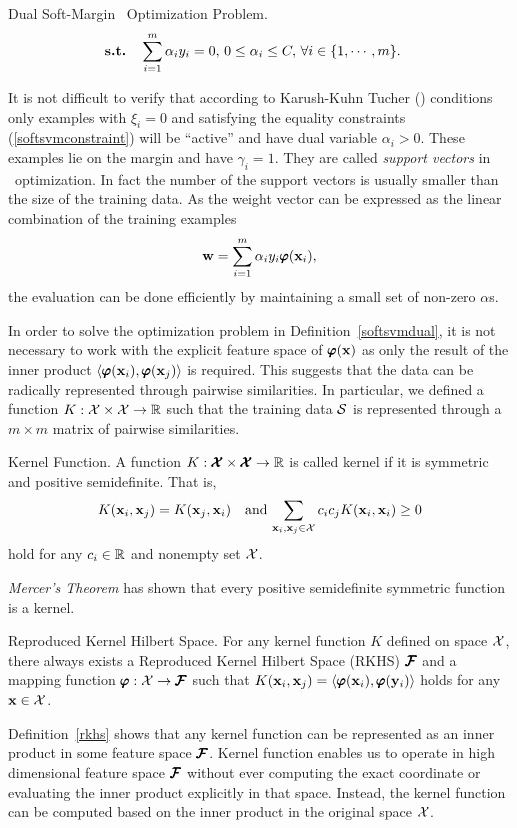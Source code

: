 {\begin{definition}{Dual Soft-Margin \svm\ Optimization Problem.}
\begin{align*}
		\textbf{s.t.} & \quad \sum_{i=1}^{m}\alpha_iy_i=0, \, 0\le\alpha_i\le C, \, \forall i\in\{1,\cdots,m\}.
	\end{align*}
\end{definition}
\noindent
It is not difficult to verify that according to Karush-Kuhn Tucher (\kkt) conditions only examples with $\xi_i=0$ and satisfying the equality constraints (\ref{softsvmconstraint}) will be ``active'' and have dual variable $\alpha_i>0$.
These examples lie on the margin and have $\gamma_i=1$.
They are called \textit{support vectors} in \svm\ optimization.
In fact the number of the support vectors is usually smaller than the size of the training data.
As the weight vector can be expressed as the linear combination of the training examples \citep{taylor04}
\begin{align*}
	\mathbf {w} = \sum_{i=1}^{m}\alpha_iy_i\pmb \varphi(\mathbf {x}_i),
\end{align*}
the evaluation can be done efficiently by maintaining a small set of non-zero $\alpha$s.

In order to solve the optimization problem in Definition~\ref{softsvmdual}, it is not necessary to work with the explicit feature space of $\pmb \varphi(\mathbf {x})$ as only the result of the inner product $\langle \pmb \varphi(\mathbf {x}_i), \pmb \varphi(\mathbf {x}_j) \rangle$ is required.
This suggests that the data can be radically represented through pairwise similarities.
In particular, we defined a function $K:\mathcal{X}\times\mathcal{X}\rightarrow\mathbb{R}$ such that the training data $\mathcal{S}$ is represented through a $m\times m$ matrix of pairwise similarities.
\begin{definition}{Kernel Function.}
 	A function $K:\pmb {\mathcal{X}}\times\pmb {\mathcal{X}}\rightarrow\mathbb{R}$ is called kernel if it is symmetric and positive semidefinite. That is, 
\begin{align*}
	K(\mathbf {x}_i,\mathbf {x}_j) = K(\mathbf {x}_j,\mathbf {x}_i)\quad \text{and}\, \sum_{\mathbf {x}_i,\mathbf {x}_j\in\mathcal{X}}c_ic_jK(\mathbf {x}_i,\mathbf {x}_i)\ge0
\end{align*}
hold for any $c_i\in\mathbb{R}$ and nonempty set $\mathcal{X}$.
\end{definition}
\noindent
\textit{Mercer's Theorem} \citep{taylor04} has shown that every positive semidefinite symmetric function is a kernel.
\begin{definition}{Reproduced Kernel Hilbert Space.} \label{rkhs}
	For any kernel function $K$ defined on space $\mathcal{X}$, there always exists a Reproduced Kernel Hilbert Space (RKHS) $\pmb {\mathcal{F}}$ and a mapping function $\pmb \varphi:\mathcal{X}\rightarrow\pmb {\mathcal{F}}$ such that $K(\mathbf {x}_i,\mathbf {x}_j)=\langle \pmb \varphi(\mathbf {x}_i), \pmb \varphi(\mathbf {y}_i) \rangle$ holds for any $\mathbf {x}\in\mathcal{X}$.
\end{definition}
\noindent
Definition~\ref{rkhs} shows that any kernel function can be represented as an inner product in some feature space $\pmb {\mathcal{F}}$.
Kernel function enables us to operate in high dimensional feature space $\pmb {\mathcal{F}}$ without ever computing the exact coordinate or evaluating the inner product explicitly in that space.
Instead, the kernel function can be computed based on the inner product in the original space $\mathcal{X}$.

}
